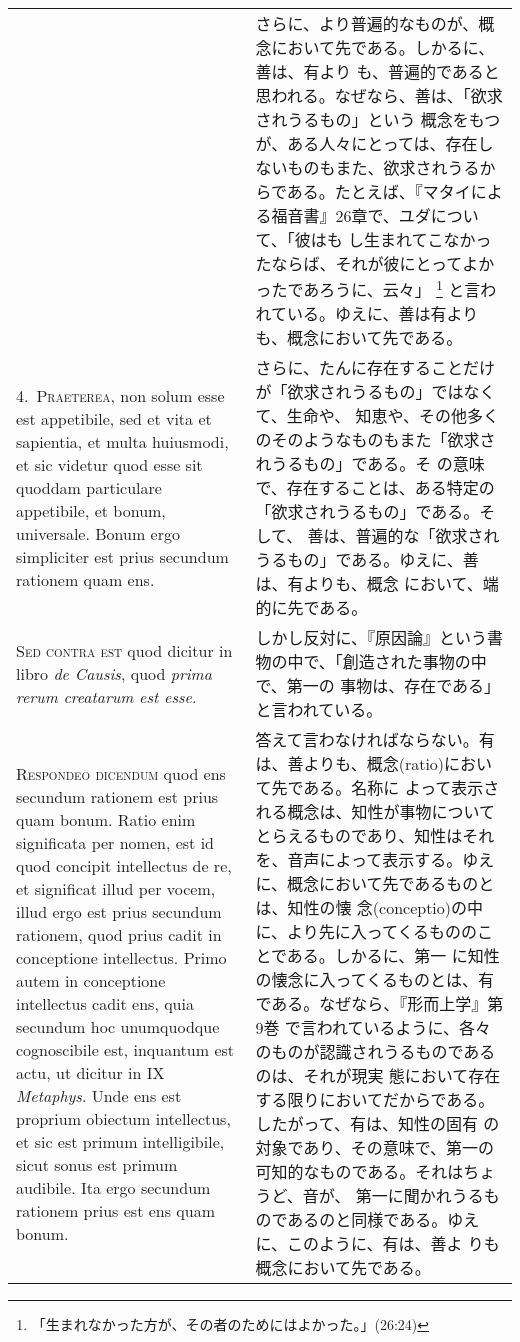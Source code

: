 \documentclass[10pt]{jsarticle} %
\begin{document}
\begin{longtable}{p{21em}p{21em}}
&

さらに、より普遍的なものが、概念において先である。しかるに、善は、有より
 も、普遍的であると思われる。なぜなら、善は、「欲求されうるもの」という
 概念をもつが、ある人々にとっては、存在しないものもまた、欲求されうるか
 らである。たとえば、『マタイによる福音書』26章で、ユダについて、「彼はも
 し生まれてこなかったならば、それが彼にとってよかったであろうに、云々」
 \footnote{「生まれなかった方が、その者のためにはよかった。」(26:24)}
 と言われている。ゆえに、善は有よりも、概念において先である。


\\

4.~{\scshape Praeterea}, non solum esse est appetibile, sed et vita et
 sapientia, et multa huiusmodi, et sic videtur quod esse sit quoddam
 particulare appetibile, et bonum, universale. Bonum ergo simpliciter
 est prius secundum rationem quam ens.

&

さらに、たんに存在することだけが「欲求されうるもの」ではなくて、生命や、
 知恵や、その他多くのそのようなものもまた「欲求されうるもの」である。そ
 の意味で、存在することは、ある特定の「欲求されうるもの」である。そして、
 善は、普遍的な「欲求されうるもの」である。ゆえに、善は、有よりも、概念
 において、端的に先である。

\\

{\scshape Sed contra est} quod dicitur in libro {\itshape de Causis},
 quod {\itshape prima rerum creatarum est esse}.

&

しかし反対に、『原因論』という書物の中で、「創造された事物の中で、第一の
 事物は、存在である」と言われている。

\\


{\scshape Respondeo dicendum} quod ens secundum rationem est prius quam
 bonum. Ratio enim significata per nomen, est id quod concipit
 intellectus de re, et significat illud per vocem, illud ergo est prius
 secundum rationem, quod prius cadit in conceptione intellectus. Primo
 autem in conceptione intellectus cadit ens, quia secundum hoc
 unumquodque cognoscibile est, inquantum est actu, ut dicitur in IX
 {\itshape Metaphys}. Unde ens est proprium obiectum intellectus, et sic
 est primum intelligibile, sicut sonus est primum audibile. Ita ergo
 secundum rationem prius est ens quam bonum.

&

答えて言わなければならない。有は、善よりも、概念(ratio)において先である。名称に
 よって表示される概念は、知性が事物についてとらえるものであり、知性はそれ
 を、音声によって表示する。ゆえに、概念において先であるものとは、知性の懐
 念(conceptio)の中に、より先に入ってくるもののことである。しかるに、第一
 に知性の懐念に入ってくるものとは、有である。なぜなら、『形而上学』第9巻
 で言われているように、各々のものが認識されうるものであるのは、それが現実
 態において存在する限りにおいてだからである。したがって、有は、知性の固有
 の対象であり、その意味で、第一の可知的なものである。それはちょうど、音が、
 第一に聞かれうるものであるのと同様である。ゆえに、このように、有は、善よ
 りも概念において先である。


\end{longtable}
\end{document}
